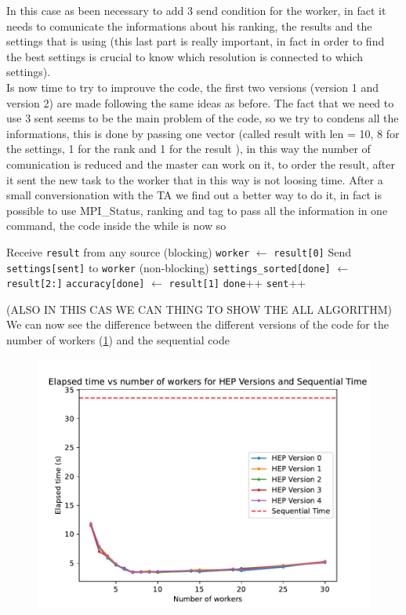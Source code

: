 \documentclass[a4paper]{article}
\theoremstyle{definition}
\theoremstyle{remark}
\begin{document}
In this case as been necessary to add 3 send condition for the worker, in fact it needs to comunicate the informations 
about his ranking, the results and the settings that is using (this last part is really important, in fact in order to find the best 
settings is crucial to know which resolution is connected to which settings).\\ Is now time to try to improuve the code, 
the first two versions (version 1 and version 2) are made following the same ideas as before. 
The fact that we need to use 3 sent seems to be the main problem of the code, so we try to condens all the 
informations, this is done by passing one vector (called result with len = 10, 8 for the settings, 1 for the rank and 1 for the result ),
in this way the number of comunication is reduced and the master can work on it, to order the result, after it sent the new task to the 
worker that in this way is not loosing time. 
After a small conversionation with the TA we find out a better way to do it, in fact is possible to use MPI\_Status, ranking and 
tag to pass all the information in one command, the code inside the while  is now so 
\begin{algorithm}[H]
    \begin{algorithmic}
    \State Receive \texttt{result} from any source (blocking)
    \State \texttt{worker} $\gets$ \texttt{result[0]}
    \State Send \texttt{settings[sent]} to \texttt{worker} (non-blocking)
    \State \texttt{settings\_sorted[done]} $\gets$ \texttt{result[2:]}
    \State \texttt{accuracy[done]} $\gets$ \texttt{result[1]}
    \State \texttt{done}++
    \State \texttt{sent}++
\EndWhile
\end{algorithmic}
\end{algorithm}
(ALSO IN THIS CAS WE CAN THING TO SHOW THE ALL ALGORITHM)
We can now see the difference between the different versions of the code for the number of workers (\ref{fig:figure2}) 
and the sequential code
\begin{figure}
    \includegraphics[width = \textwidth]{exercise2.pdf}
    \label{fig:figure2}
\end{figure}
\end{document}
